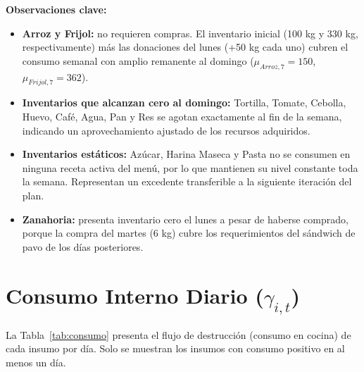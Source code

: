 \documentclass[12pt, a4paper]{article}
\begin{document}
\noindent\textbf{Observaciones clave:}
\begin{itemize}
    \item \textbf{Arroz y Frijol:} no requieren compras. El inventario inicial (100 kg y 330 kg,
          respectivamente) más las donaciones del lunes (+50 kg cada uno) cubren el consumo
          semanal con amplio remanente al domingo ($\mu_{Arroz,7} = 150$, $\mu_{Frijol,7} = 362$).
    \item \textbf{Inventarios que alcanzan cero al domingo:} Tortilla, Tomate, Cebolla, Huevo,
          Café, Agua, Pan y Res se agotan exactamente al fin de la semana, indicando un
          aprovechamiento ajustado de los recursos adquiridos.
    \item \textbf{Inventarios estáticos:} Azúcar, Harina Maseca y Pasta no se consumen en
          ninguna receta activa del menú, por lo que mantienen su nivel constante toda la semana.
          Representan un excedente transferible a la siguiente iteración del plan.
    \item \textbf{Zanahoria:} presenta inventario cero el lunes a pesar de haberse comprado,
          porque la compra del martes (6 kg) cubre los requerimientos del sándwich de pavo
          de los días posteriores.
\end{itemize}

\section{Consumo Interno Diario ($\gamma_{i,t}$)}

La Tabla~\ref{tab:consumo} presenta el flujo de destrucción (consumo en cocina) de cada
insumo por día. Solo se muestran los insumos con consumo positivo en al menos un día.
\end{document}
